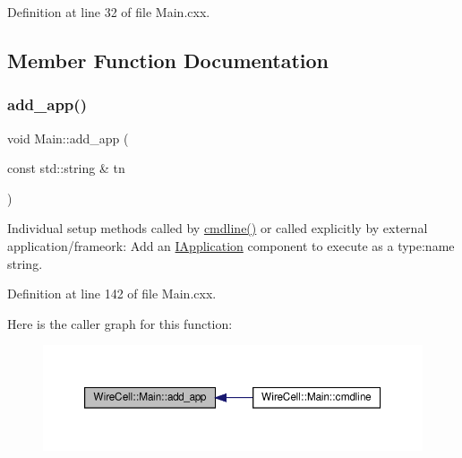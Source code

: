 Definition at line 32 of file Main.\+cxx.



\subsection{Member Function Documentation}
\mbox{\label{class_wire_cell_1_1_main_af256b8bb1a2af9cdd7a96468db4c929d}} 
\subsubsection{\texorpdfstring{add\+\_\+app()}{add\_app()}}
{\footnotesize\ttfamily void Main\+::add\+\_\+app (\begin{DoxyParamCaption}\item[{const std\+::string \&}]{tn }\end{DoxyParamCaption})}

Individual setup methods called by \hyperlink{class_wire_cell_1_1_main_a6d6b47f6893cc6474d71d70bf5f8adcb}{cmdline()} or called explicitly by external application/frameork\+: Add an \hyperlink{class_wire_cell_1_1_i_application}{I\+Application} component to execute as a {\ttfamily type\+:name} string. 

Definition at line 142 of file Main.\+cxx.

Here is the caller graph for this function\+:
\nopagebreak
\begin{figure}[H]
\begin{center}
\leavevmode
\includegraphics[width=350pt]{class_wire_cell_1_1_main_af256b8bb1a2af9cdd7a96468db4c929d_icgraph}
\end{center}
\end{figure}
\mbox{\label{class_wire_cell_1_1_main_aed27a7aa4fcf7fc4bb03637bc226f318}} 
